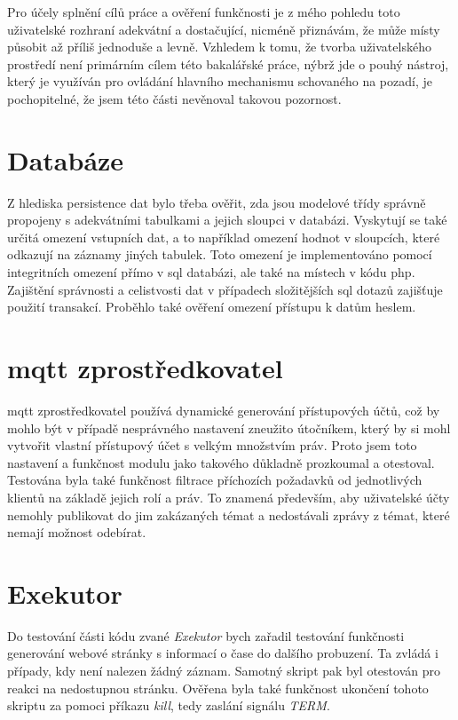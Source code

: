 Pro účely splnění cílů práce a ověření funkčnosti je z mého pohledu toto uživatelské rozhraní adekvátní a dostačující, nicméně přiznávám, že může místy působit až příliš jednoduše a levně. Vzhledem k tomu, že tvorba uživatelského prostředí není primárním cílem této bakalářské práce, nýbrž jde o pouhý nástroj, který je využíván pro ovládání hlavního mechanismu schovaného na pozadí, je pochopitelné, že jsem této části nevěnoval takovou pozornost.

\section{Databáze}

Z hlediska persistence dat bylo třeba ověřit, zda jsou modelové třídy správně propojeny s adekvátními tabulkami a jejich sloupci v databázi. Vyskytují se také určitá omezení vstupních dat, a to například omezení hodnot v sloupcích, které odkazují na záznamy jiných tabulek. Toto omezení je implementováno pomocí integritních omezení přímo v \acrshort{sql} databázi, ale také na místech v kódu \acrshort{php}. Zajištění správnosti a celistvosti dat v případech složitějších \acrshort{sql} dotazů zajišťuje použití transakcí. Proběhlo také ověření omezení přístupu k datům heslem.

\section{\acrshort{mqtt} zprostředkovatel}

\acrshort{mqtt} zprostředkovatel používá dynamické generování přístupových účtů, což by mohlo být v případě nesprávného nastavení zneužito útočníkem, který by si mohl vytvořit vlastní přístupový účet s velkým množstvím práv. Proto jsem toto nastavení a funkčnost modulu jako takového důkladně prozkoumal a otestoval. Testována byla také funkčnost filtrace příchozích požadavků od jednotlivých klientů na základě jejich rolí a práv. To znamená především, aby uživatelské účty nemohly publikovat do jim zakázaných témat a nedostávali zprávy z témat, které nemají možnost odebírat. 

\section{Exekutor}

Do testování části kódu zvané \emph{Exekutor} bych zařadil testování funkčnosti generování webové stránky s informací o čase do dalšího probuzení. Ta zvládá i případy, kdy není nalezen žádný záznam. Samotný skript pak byl otestován pro reakci na nedostupnou stránku. Ověřena byla také funkčnost ukončení tohoto skriptu za pomoci příkazu \emph{kill}, tedy zaslání signálu \emph{TERM}.

